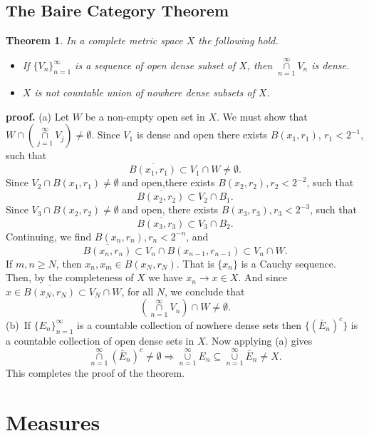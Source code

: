 \documentclass[12pt]{report}
\newtheorem{theorem}{Theorem}[section]
\begin{document}
\section{The Baire Category Theorem}
\begin{theorem}\label{th:Baire-Cat}  
In a complete metric space $X$ the following hold.
\begin{itemize}
\item[(a)]  If $\{V_n\}^\infty_{n=1} $ is a sequence of open dense
subset of $X$, then $\overset{\infty}{\underset{n=1}{\cap}}V_n
$ is dense.
\item[(b)]  $X$ is not countable union of nowhere dense subsets of
$X$.
\end{itemize}
\end{theorem}
{\bf proof.} (a)  Let $W$ be a non-empty open set in $X$.  We must show
that
$W
\cap \left (\overset{\infty}{\underset{j=1}{\cap}} V_j\right ) \ne
\emptyset.$
Since $V_1$ is dense and open there exists $B(x_1, r_1)$, $ r_1 < 2^{-1}$,
such that  
\[
\overline{B(x_1, r_1)} \subset V_1 \cap W \ne \emptyset.
\]
Since $V_2 \cap B(x_1, r_1) \ne \emptyset$ and open,there exists 
$B(x_2, r_2), r_2 < 2^{-2}$, such that
\[
\overline{B(x_2, r_2)} \subset V_2 \cap B_1.
\]
Since $V_3 \cap B(x_2, r_2) \ne \emptyset$ and open,
there exists $ B (x_3, r_3), r_3 < 2^{-3}$, such that
\[
\overline{B(x_3, r_3)} \subset V_3 \cap B_2.
\]
Continuing, we find $B (x_n, r_n), r_n < 2^{-n}$, and 
\[
\overline{B(x_n, r_n)} \subset V_n \cap B(x_{n-1}, r_{n-1})
\subset V_n \cap W.
\]
If $m, n \ge N$, then  $x_n, x_m \in B(x_N, r_N)$. That is
$\{x_n\}$ is a Cauchy sequence.  Then, by
 the completeness of $X$ we have  $ x_n \to x \in X $. And since
$x \in \overline{B(x_N, r_N)} \subset V_N \cap W$, for all $N$,  we
conclude that
\[
\left ( \overset{\infty}{\underset{n=1}{\cap}} V_n\right ) \cap W \ne
\emptyset.
\]
(b)\,  If $\{E_n\}^\infty_{n=1} $ is a countable collection of 
nowhere dense sets then
 $\{(\bar  E_n)^c\}$ is a countable collection of open dense sets in $X$.
Now applying (a) gives
\[
\overset{\infty}{\underset{n=1}{\cap}}(\bar E_n)^c \ne \emptyset
\Longrightarrow \overset{\infty}{\underset{n=1}{\cup}}  E_n
\subseteq \overset{\infty}{\underset{n=1}{\cup}} \bar E_n \ne X.
\]
This completes the proof of the theorem.






%
%

\chapter{Measures}
\end{document}
